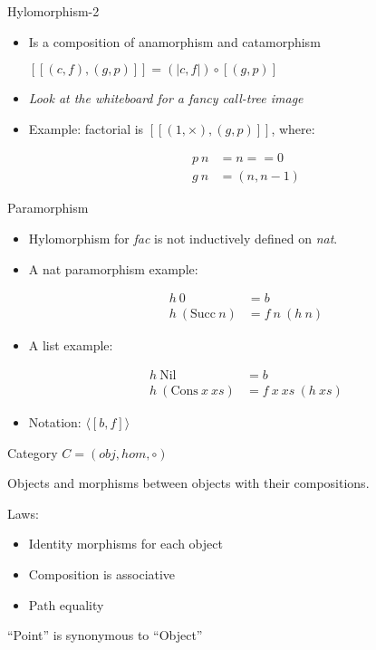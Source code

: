 \documentclass{beamer}
\begin{document}
\begin{frame}{Hylomorphism-2}
\begin{itemize}

\item Is a composition of anamorphism and catamorphism

$[\![(c,f), (g,p)]\!] = (\!|c, f|\!) \circ [\!(g, p)\!]$

\item \textit{Look at the whiteboard for a fancy call-tree image}
\item Example: factorial is $[\![(1, \times), (g,p)]\!]$, where:

\begin{align*}
p\ n &= n == 0 \\
g\ n &= (n, n-1)
\end{align*}
\end{itemize}
\end{frame}


\begin{frame}[fragile]{Paramorphism}

\begin{itemize}
\item Hylomorphism for \textit{fac }is not inductively defined on \textit{nat}.
\item A nat paramorphism example:

\begin{align*}
h\ 0&= b\\
h\ (\text{Succ} \ n ) &= f\ n\ (h\ n)
\end{align*}

\item A list example:

\begin{align*}
h\ \text{Nil}& = b\\
h\ (\text{Cons}\ x\ xs ) &= f\ x\ xs\ (h\ xs)
\end{align*}

\item Notation: $\langle\![ b, f ]\!\rangle$
\end{itemize}

\end{frame}

\begin{frame}{Category}
$C = (obj, hom, \circ)$

Objects and morphisms between objects with their compositions.

Laws:
\begin{itemize}
\item Identity morphisms for each object
\item Composition is associative
\item Path equality
\end{itemize}

``Point'' is synonymous to ``Object''
\end{frame}
\end{document}
